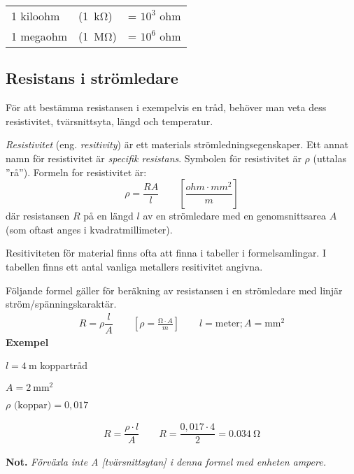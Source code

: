 \begin{center}
\begin{tabular}{lll}
  1 kiloohm & (\SI{1}{\kilo\ohm}) & = \(10^3\) ohm \\
  1 megaohm & (\SI{1}{\mega\ohm}) & = \(10^6\) ohm \\
\end{tabular}
\end{center}

\subsection{Resistans i strömledare}

För att bestämma resistansen i exempelvis en tråd, behöver man veta dess 
resistivitet, tvärsnittsyta, längd och temperatur.

\emph{Resistivitet} (eng. \emph{resitivity}) är ett materials
strömledningsegenskaper.
Ett annat namn för resistivitet är \emph{specifik resistans}.
Symbolen för resistivitet är \(\rho\) (uttalas ''rå'').
Formeln for resistivitet är:
\[\rho = \dfrac{R A}{l}\qquad \left[\dfrac{ohm \cdot mm^2}{m}\right]\]
där resistansen \(R\) på en längd \(l\) av en strömledare med en
genomsnittsarea \(A\) (som oftast anges i kvadratmillimeter).

Resitiviteten för material finns ofta att finna i tabeller i formelsamlingar.  I tabellen
 finns ett antal vanliga metallers resitivitet
angivna.

Följande formel gäller för beräkning av resistansen i en strömledare med
linjär ström/spänningskaraktär.
\[\begin{array}{c}
    R = \rho \dfrac{l}{A} \qquad \left[\rho = \frac{\si{\ohm} \cdot A}{m} \right] \qquad l=\text{meter}; A=\si{\milli\metre\squared}
\end{array}\]
\noindent
\textbf{Exempel}

\(l = \SI{4}{\metre}\) koppartråd

\(A = \SI{2}{\milli\metre\squared}\)

\(\rho \text{ (koppar)} = 0,017\)

\[\begin{array}{c}
R = \dfrac{\rho \cdot l}{A} \qquad R = \dfrac{0,017 \cdot 4}{2} = \SI{0,034}{\ohm}
\end{array}\]

\noindent
\textbf{Not.} \emph{Förväxla inte A [tvärsnittsytan] i denna formel med enheten ampere.}


